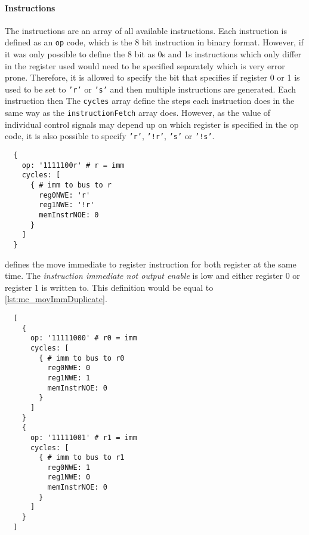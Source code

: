 \paragraph{Instructions} The instructions are an array of all available instructions.
Each instruction is defined as an \texttt{op} code, which is the 8 bit instruction in binary format.
However, if it was only possible to define the 8 bit as 0s and 1s instructions which only differ in the register used would need to be specified separately which is very error prone.
Therefore, it is allowed to specify the bit that specifies if register 0 or 1 is used to be set to \texttt{'r'} or \texttt{'s'} and then multiple instructions are generated.
Each instruction then The \texttt{cycles} array define the steps each instruction does in the same way as the \texttt{instructionFetch} array does.
However, as the value of individual control signals may depend up on which register is specified in the op code, it is also possible to specify \texttt{'r'}, \texttt{'!r'}, \texttt{'s'} or \texttt{'!s'}.

\begin{listing}[h!]
  \begin{verbatim}
  {
    op: '1111100r' # r = imm
    cycles: [
      { # imm to bus to r
        reg0NWE: 'r'
        reg1NWE: '!r'
        memInstrNOE: 0
      }
    ]
  }
  \end{verbatim}
  \caption{Definition of the move immediate to register instruction for the microcode generation.}
  \label{lst:mc_movImm}
\end{listing}
 defines the move immediate to register instruction for both register at the same time.
The \emph{instruction immediate not output enable} is low and either register 0 or register 1 is written to.
This definition would be equal to \cref{lst:mc_movImmDuplicate}.
\begin{listing}[h!]
  \begin{verbatim}
  [
    {
      op: '11111000' # r0 = imm
      cycles: [
        { # imm to bus to r0
          reg0NWE: 0
          reg1NWE: 1
          memInstrNOE: 0
        }
      ]
    }
    {
      op: '11111001' # r1 = imm
      cycles: [
        { # imm to bus to r1
          reg0NWE: 1
          reg1NWE: 0
          memInstrNOE: 0
        }
      ]
    }
  ]
  \end{verbatim}
  \caption{Definitions of the move immediate to register instruction for each register separately for the microcode generation.}
  \label{lst:mc_movImmDuplicate}
\end{listing}

